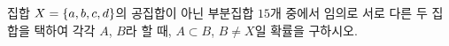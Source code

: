집합 $X=\{a{,}\mkern3mu\mathopen{}b{,}\mkern3mu\mathopen{}c{,}\mkern3mu\mathopen{}d\}$의 공집합이 아닌 부분집합 $15$개 중에서 임의로 서로 다른 두 집합을 택하여 각각 $A$, $B$라 할 때, $A\subset B$, $B\ne X$일 확률을 구하시오.

